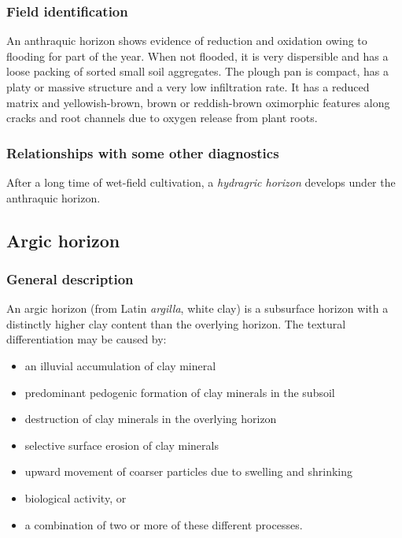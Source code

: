 \documentclass[
  letterpaper,
  DIV=11,
  numbers=noendperiod]{scrreprt}
\providecommand{\tightlist}{%
  \setlength{\itemsep}{0pt}\setlength{\parskip}{0pt}}\usepackage{longtable,booktabs,array}
\begin{document}
\hypertarget{field-identification}{%
\subsubsection{Field identification}\label{field-identification}}

An anthraquic horizon shows evidence of reduction and oxidation owing to
flooding for part of the year. When not flooded, it is very dispersible
and has a loose packing of sorted small soil aggregates. The plough pan
is compact, has a platy or massive structure and a very low infiltration
rate. It has a reduced matrix and yellowish-brown, brown or
reddish-brown oximorphic features along cracks and root channels due to
oxygen release from plant roots.

\hypertarget{relationships-with-some-other-diagnostics-1}{%
\subsubsection{Relationships with some other
diagnostics}\label{relationships-with-some-other-diagnostics-1}}

After a long time of wet-field cultivation, a \emph{hydragric horizon}
develops under the anthraquic horizon.

\hypertarget{argic-horizon}{%
\subsection{Argic horizon}\label{argic-horizon}}

\hypertarget{general-description-2}{%
\subsubsection{General description}\label{general-description-2}}

An argic horizon (from Latin \emph{argilla}, white clay) is a subsurface
horizon with a distinctly higher clay content than the overlying
horizon. The textural differentiation may be caused by:

\begin{itemize}
\tightlist
\item
  an illuvial accumulation of clay mineral
\item
  predominant pedogenic formation of clay minerals in the subsoil
\item
  destruction of clay minerals in the overlying horizon
\item
  selective surface erosion of clay minerals
\item
  upward movement of coarser particles due to swelling and shrinking
\item
  biological activity, or
\item
  a combination of two or more of these different processes.
\end{itemize}
\end{document}
